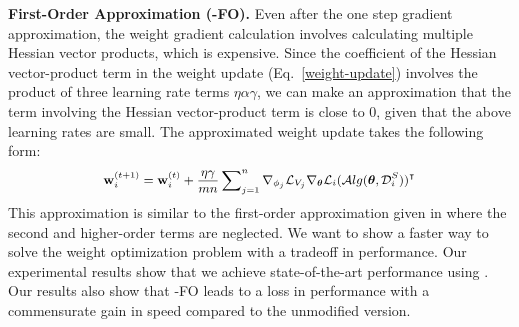 \noindent \textbf{First-Order Approximation (\sysname{}-FO).} Even after the one step gradient approximation, the weight gradient calculation involves calculating multiple Hessian vector products, which is expensive. Since the coefficient of the Hessian vector-product term in the weight update (Eq.~\eqref{weight-update}) involves the product of three learning rate terms $\eta\alpha\gamma$,  we can make an approximation that the term involving the Hessian vector-product term is close to 0, given that the above learning rates are small. 
The approximated weight update takes the following form:
\begin{equation}
\small
    \label{weight-update-appr}
        \mathbf{w}_i^{(t+1)}=\mathbf{w}_i^{(t)} + \frac{\eta \gamma}{mn} \sum\nolimits_{j=1}^{n} \nabla_{\phi_j} \mathcal{L}_{V_j} \nabla_{\boldsymbol{\theta}}\mathcal{L}_i(\mathcal{A}lg(\boldsymbol{\theta}, \mathcal{D}_i^S))^{\intercal}
\end{equation}
This approximation is similar to the first-order approximation given in \citep{finn2017model} where the second and higher-order terms are neglected. We want to show a faster way to solve the \textit{\biopt{}} weight optimization problem with a tradeoff in performance. Our experimental results show that we achieve state-of-the-art performance using \sysname{}. Our results also show that \sysname{}-FO leads to a loss in performance with a commensurate gain in speed compared to the unmodified \sysname{} version. 



